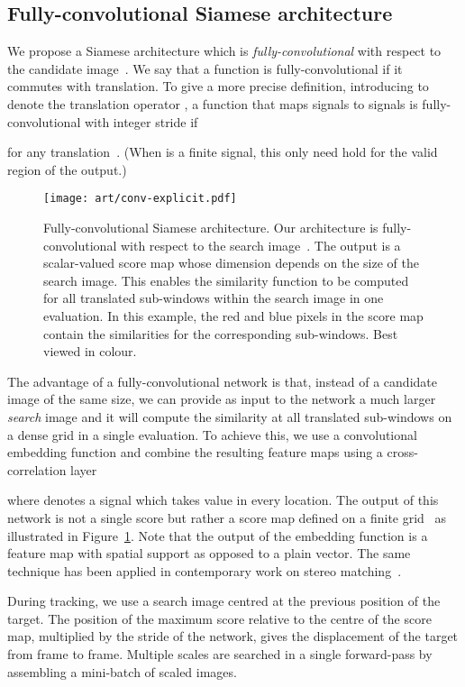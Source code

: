 \documentclass[runningheads]{llncs}
\begin{document}
\subsection{Fully-convolutional Siamese architecture}

We propose a Siamese architecture which is \emph{fully-convolutional} with respect to the candidate image~.
We say that a function is fully-convolutional if it commutes with translation.
To give a more precise definition, introducing  to denote the translation operator , a function  that maps signals to signals is fully-convolutional with integer stride  if

for any translation~.
(When  is a finite signal, this only need hold for the valid region of the output.)

\begin{figure}[t]
\centering
\texttt{[image: art/conv-explicit.pdf]}
\caption{Fully-convolutional Siamese architecture.
Our architecture is fully-convolutional with respect to the search image~.
The output is a scalar-valued score map whose dimension depends on the size of the search image.
This enables the similarity function to be computed for all translated sub-windows within the search image in one evaluation.
In this example, the red and blue pixels in the score map contain the similarities for the corresponding sub-windows.
Best viewed in colour.
}
\label{fig:fully-conv-siamese}
\end{figure}

The advantage of a fully-convolutional network is that, instead of a candidate image of the same size, we can provide as input to the network a much larger \emph{search} image and it will compute the similarity at all translated sub-windows on a dense grid in a single evaluation.
To achieve this, we use a convolutional embedding function  and combine the resulting feature maps using a cross-correlation layer

where  denotes a signal which takes value  in every location.
The output of this network is not a single score but rather a score map defined on a finite grid~ as illustrated in Figure~\ref{fig:fully-conv-siamese}.
Note that the output of the embedding function is a feature map with spatial support as opposed to a plain vector.
The same technique has been applied in contemporary work on stereo matching~\cite{luo2016efficient}.

During tracking, we use a search image centred at the previous position of the target.
The position of the maximum score relative to the centre of the score map, multiplied by the stride of the network, gives the displacement of the target from frame to frame.
Multiple scales are searched in a single forward-pass by assembling a mini-batch of scaled images.
\end{document}
